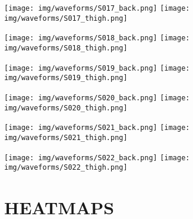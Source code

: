         \begin{multicols}{2} \centering \noindent
            \texttt{[image: img/waveforms/S017\_back.png]}
            \texttt{[image: img/waveforms/S017\_thigh.png]}
        \end{multicols}
        \begin{multicols}{2} \centering \noindent
            \texttt{[image: img/waveforms/S018\_back.png]}
            \texttt{[image: img/waveforms/S018\_thigh.png]}
        \end{multicols}
        \begin{multicols}{2} \centering \noindent
            \texttt{[image: img/waveforms/S019\_back.png]}
            \texttt{[image: img/waveforms/S019\_thigh.png]}
        \end{multicols}
        \pagebreak

        \begin{multicols}{2} \centering \noindent
            \texttt{[image: img/waveforms/S020\_back.png]}
            \texttt{[image: img/waveforms/S020\_thigh.png]}
        \end{multicols}
        \begin{multicols}{2} \centering \noindent
            \texttt{[image: img/waveforms/S021\_back.png]}
            \texttt{[image: img/waveforms/S021\_thigh.png]}
        \end{multicols}
        \begin{multicols}{2} \centering \noindent
            \texttt{[image: img/waveforms/S022\_back.png]}
            \texttt{[image: img/waveforms/S022\_thigh.png]}
        \end{multicols}
        \pagebreak

    \section{HEATMAPS}

